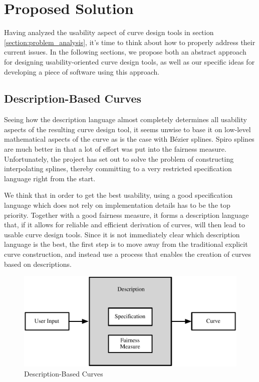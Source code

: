\documentclass[a4paper]{article}
\begin{document}
	\section{Proposed Solution}
	\label{section:proposed_solution}

		Having analyzed the usability aspect of curve design tools in section \ref{section:problem_analysis}, it's time to think about how to properly address their current issues. In the following sections, we propose both an abstract approach for designing usability-oriented curve design tools, as well as our specific ideas for developing a piece of software using this approach.
          
		\subsection{Description-Based Curves}
		\label{section:description-based_curves}

			Seeing how the description language almost completely determines all usability aspects of the resulting curve design tool, it seems unwise to base it on low-level mathematical aspects of the curve as is the case with Bézier splines. Spiro splines are much better in that a lot of effort was put into the fairness measure. Unfortunately, the project has set out to solve the problem of constructing interpolating splines, thereby committing to a very restricted specification language right from the start.

			We think that in order to get the best usability, using a good specification language which does not rely on implementation details has to be the top priority. Together with a good fairness measure, it forms a description language that, if it allows for reliable and efficient derivation of curves, will then lead to usable curve design tools. Since it is not immediately clear which description language is the best, the first step is to move away from the traditional explicit curve construction, and instead use a process that enables the creation of curves based on descriptions.

			\begin{figure}[htbp]
				\centering
				\includegraphics[width=\textwidth]{../resources/description-based_curves.pdf}
				\caption{Description-Based Curves}
				\label{figure:description-based_curves}
			\end{figure}
\end{document}

